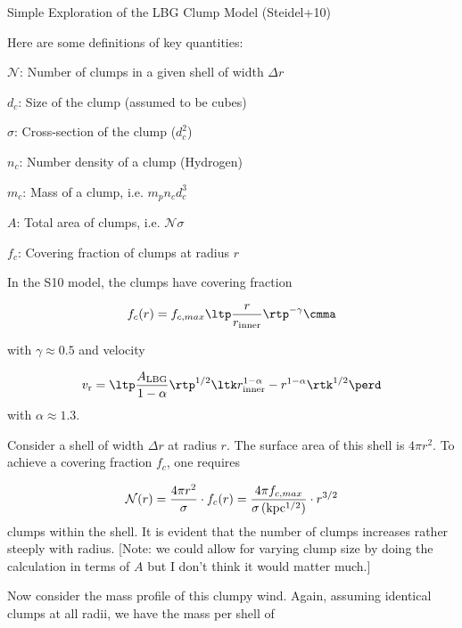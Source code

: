 \documentclass[12pt,letterpaper]{article}
\newcommand{\nc}{$\mathcal{N}$}
\newcommand{\mnc}{\mathcal{N}}
\newcommand{\mvr}{v_{\rm r}}
\newenvironment{my_itemize}{
\begin{itemize}
  \setlength{\itemsep}{1pt}
  \setlength{\parskip}{0pt}
  \setlength{\parsep}{0pt}}{\end{itemize}
}
\begin{document}
\begin{center}
{\Large Simple Exploration of the LBG Clump Model (Steidel+10)}
\end{center}

Here are some definitions of key quantities: 

\begin{my_itemize}
\item \nc: Number of clumps in a given shell of width $\Delta r$
\item $d_c$: Size of the clump (assumed to be cubes)
\item $\sigma$: Cross-section of the clump ($d_c^2$)
\item $n_c$: Number density of a clump (Hydrogen)
\item $m_c$: Mass of a clump, i.e. $m_p n_c d_c^3$
\item $A$: Total area of clumps, i.e. $\mnc \sigma$
\item $f_c$: Covering fraction of clumps at radius $r$
\end{my_itemize}

In the S10 model, the clumps have covering fraction

\begin{equation}
f_c(r) = f_{c,max} \ltp \frac{r}{r_{\rm inner}} \rtp^{-\gamma} \cmma
\label{eqn:covering}
\end{equation}

with $\gamma \approx 0.5$ and velocity

\begin{equation}
\mvr = \ltp \frac{A_{\rm LBG}}{1-\alpha} \rtp^{1/2} \ltk r_{\rm
  inner}^{1-\alpha} - r^{1-\alpha} \rtk^{1/2} \perd
\label{eqn:LBG_vlaw}
\end{equation}
with $\alpha \approx 1.3$.

Consider a shell of width $\Delta r$ at radius $r$.  The surface area
of this shell is $4\pi r^2$.  To achieve a covering fraction $f_c$,
one requires

\begin{equation}
\mnc(r) = \frac{4 \pi r^2}{\sigma} \cdot f_c(r) = 
\frac{4 \pi f_{c,max}}{\sigma \, (\rm kpc^{1/2})} \cdot r^{3/2}
\end{equation}
clumps within the shell.  It is evident that the number of clumps
increases rather steeply with radius.  [Note: we could allow for
varying clump size by doing the calculation in terms of $A$ but I
don't think it would matter much.]

Now consider the mass profile of this clumpy wind.  Again, assuming
identical clumps at all radii, we have the mass per shell of 
\end{document}

